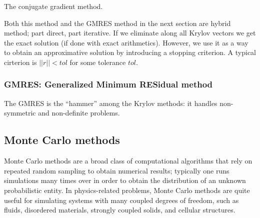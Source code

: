 \begin{algorithm}[H]
  \caption{The conjugate gradient method.}
\end{algorithm}

Both this method and the GMRES method in the next section are hybrid method; part direct, part iterative. If we eliminate along all Krylov vectors we get the exact solution (if done with exact arithmetics). However, we use it as a way to obtain an approximative solution by introducing a stopping criterion. A typical cirterion is $\vert\vert r \vert\vert < tol$ for some tolerance $tol$.





\subsubsection{GMRES: Generalized Minimum RESidual method} %
\label{ssub:gmres_generalized_minimum_residual_method}
The GMRES is the ``hammer'' among the Krylov methods: it handles non-symmetric and non-definite problems.



\subsection{Monte Carlo methods} %
\label{sub:monte_carlo_methods}
Monte Carlo methods are a broad class of computational algorithms that rely on repeated random sampling to obtain numerical results; typically one runs simulations many times over in order to obtain the distribution of an unknown probabilistic entity. In physics-related problems, Monte Carlo methods are quite useful for simulating systems with many coupled degrees of freedom, such as fluids, disordered materials, strongly coupled solids, and cellular structures.

